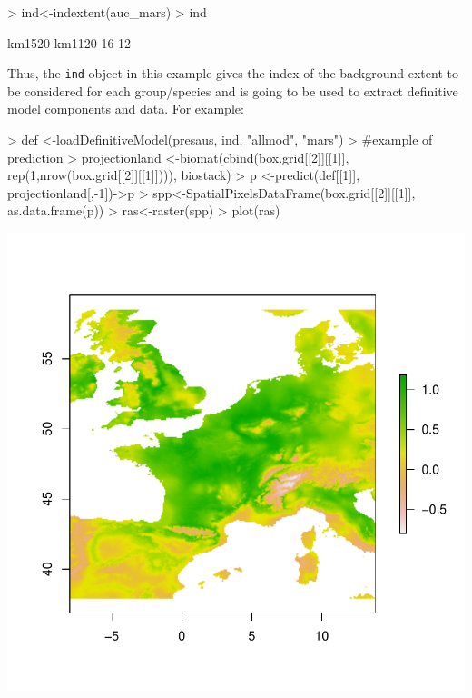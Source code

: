 \documentclass[10pt,a4paper]{report}
\begin{document}
\begin{Schunk}
\begin{Sinput}
> ind<-indextent(auc_mars)
> ind
\end{Sinput}
\begin{Soutput}
km1520 km1120 
    16     12 
\end{Soutput}
\end{Schunk}

Thus, the \texttt{ind} object in this example gives the index of the background extent to be considered for each group/species and is going to be used to extract definitive model components and data. For example:

\begin{Schunk}
\begin{Sinput}
> def <-loadDefinitiveModel(presaus, ind, "allmod", "mars")
> #example of prediction
> projectionland <-biomat(cbind(box.grid[[2]][[1]], rep(1,nrow(box.grid[[2]][[1]]))), biostack)
> p <-predict(def[[1]], projectionland[,-1])->p
> spp<-SpatialPixelsDataFrame(box.grid[[2]][[1]], as.data.frame(p))
> ras<-raster(spp)
> plot(ras)
\end{Sinput}
\end{Schunk}
\includegraphics{mopa-mopa15}






\end{document}
